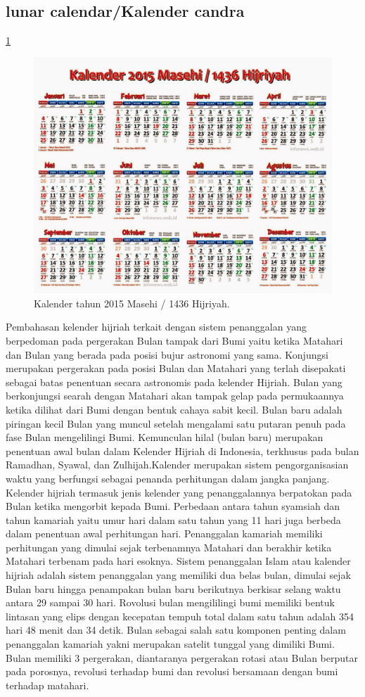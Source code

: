   \subsection{lunar calendar/Kalender candra}
    \ref{Kalender_2015}
    \begin{figure}[ht]
    \centerline{\includegraphics[width=.5\textwidth]{figures/Kalender_2015.JPG}}
    \caption{Kalender tahun 2015 Masehi / 1436 Hijriyah.}
    \label{Kalender_2015}
    \end{figure}
    Pembahasan kelender hijriah terkait dengan sistem penanggalan yang berpedoman pada pergerakan Bulan tampak dari Bumi yaitu ketika Matahari dan Bulan yang berada pada posisi bujur astronomi yang sama. Konjungsi merupakan pergerakan pada posisi Bulan dan Matahari yang terlah disepakati sebagai batas penentuan secara astronomis pada kelender Hijriah.
  Bulan yang berkonjungsi searah dengan Matahari akan tampak gelap pada permukaannya ketika dilihat dari Bumi dengan bentuk cahaya sabit kecil. Bulan baru adalah piringan kecil Bulan yang muncul setelah mengalami satu putaran penuh pada fase Bulan mengelilingi Bumi.
  Kemunculan hilal (bulan baru) merupakan penentuan awal bulan dalam Kelender Hijriah di Indonesia, terkhusus pada bulan Ramadhan, Syawal, dan Zulhijah.Kalender merupakan sistem pengorganisasian waktu yang berfungsi sebagai penanda perhitungan dalam jangka panjang. Kelender hijriah termasuk jenis kelender yang penanggalannya berpatokan pada Bulan ketika mengorbit kepada Bumi.
  Perbedaan antara tahun syamsiah dan tahun kamariah yaitu umur hari dalam satu tahun yang 11 hari juga berbeda dalam penentuan awal perhitungan hari. Penanggalan kamariah memiliki perhitungan yang dimulai sejak terbenamnya Matahari dan berakhir ketika Matahari terbenam pada hari esoknya.
  Sistem penanggalan Islam atau kalender hijriah adalah sistem penanggalan yang memiliki dua belas bulan, dimulai sejak Bulan baru hingga penampakan bulan baru berikutnya berkisar selang waktu antara 29 sampai 30 hari. Rovolusi bulan mengililingi bumi memiliki bentuk lintasan yang elips dengan kecepatan tempuh total dalam satu tahun adalah 354 hari 48 menit dan 34 detik.
  Bulan sebagai salah satu komponen penting dalam penanggalan kamariah yakni merupakan satelit tunggal yang dimiliki Bumi. Bulan memiliki 3 pergerakan, diantaranya pergerakan rotasi atau Bulan berputar pada porosnya, revolusi terhadap bumi dan revolusi bersamaan dengan bumi terhadap matahari.


